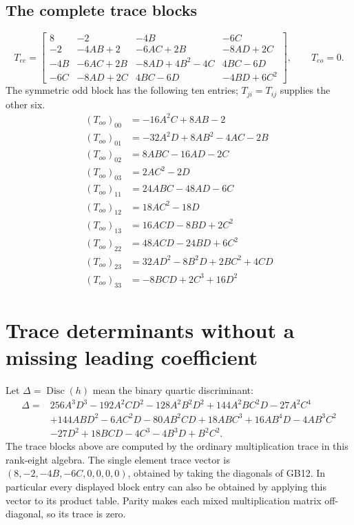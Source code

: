 \documentclass[11pt]{article}
\providecommand{\Disc}{\operatorname{Disc}}
\begin{document}
\subsection{The complete trace blocks}
\begin{equation}T_{ee}=\left[\begin{matrix}8 & -2 & - 4 B & - 6 C\\-2 & - 4 A B + 2 & - 6 A C + 2 B & - 8 A D + 2 C\\- 4 B & - 6 A C + 2 B & - 8 A D + 4 B^{2} - 4 C & 4 B C - 6 D\\- 6 C & - 8 A D + 2 C & 4 B C - 6 D & - 4 B D + 6 C^{2}\end{matrix}\right],\qquad T_{eo}=0.\tag{GB16}\end{equation}
The symmetric odd block has the following ten entries; $T_{ji}=T_{ij}$ supplies the other six.
\begin{align}
(T_{oo})_{00}&=- 16 A^{2} C + 8 A B - 2\tag{GB17a}\\
(T_{oo})_{01}&=- 32 A^{2} D + 8 A B^{2} - 4 A C - 2 B\tag{GB17b}\\
(T_{oo})_{02}&=8 A B C - 16 A D - 2 C\tag{GB17c}\\
(T_{oo})_{03}&=2 A C^{2} - 2 D\tag{GB17d}\\
(T_{oo})_{11}&=24 A B C - 48 A D - 6 C\tag{GB17e}\\
(T_{oo})_{12}&=18 A C^{2} - 18 D\tag{GB17f}\\
(T_{oo})_{13}&=16 A C D - 8 B D + 2 C^{2}\tag{GB17g}\\
(T_{oo})_{22}&=48 A C D - 24 B D + 6 C^{2}\tag{GB17h}\\
(T_{oo})_{23}&=32 A D^{2} - 8 B^{2} D + 2 B C^{2} + 4 C D\tag{GB17i}\\
(T_{oo})_{33}&=- 8 B C D + 2 C^{3} + 16 D^{2}\tag{GB17j}
\end{align}


\section{Trace determinants without a missing leading coefficient}
Let $\Delta=\Disc(h)$ mean the binary quartic discriminant:
\begin{equation}
 \begin{aligned}
 \Delta={}&256A^3D^3-192A^2CD^2-128A^2B^2D^2
 +144A^2BC^2D-27A^2C^4\\
 &+144ABD^2-6AC^2D-80AB^2CD+18ABC^3
 +16AB^4D-4AB^3C^2\\
 &-27D^2+18BCD-4C^3-4B^3D+B^2C^2 .
 \end{aligned}
 \tag{GB18}
\end{equation}
The trace blocks above are computed by the ordinary
multiplication trace in this rank-eight algebra. The single
element trace vector is
$(8,-2,-4B,-6C,0,0,0,0)$, obtained by taking the diagonals
of GB12. In particular every displayed block entry can also
be obtained by applying this vector to its product table.
Parity makes each mixed multiplication matrix off-diagonal,
so its trace is zero.
\end{document}
